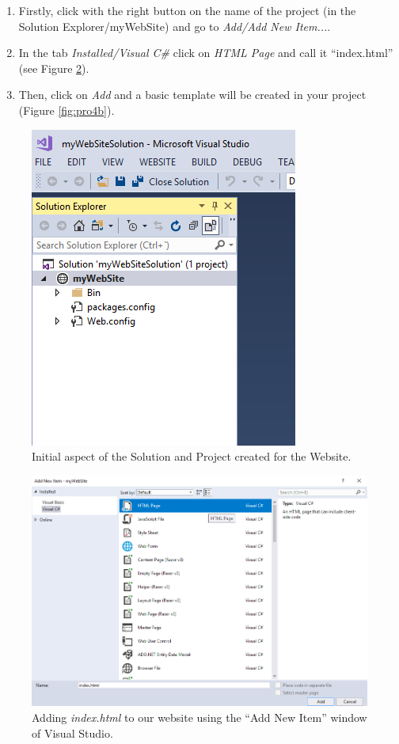 \begin{enumerate}
    \item Firstly, click with the right button on the name of the project (in the Solution Explorer/myWebSite) and go to \textit{Add/Add New Item...}.
    \item In the tab \textit{Installed/Visual C\#} click on \textit{HTML Page} and call it ``index.html'' (see Figure \ref{fig:pro4a}).
    \item Then, click on \textit{Add} and a basic template will be created in your project (Figure \ref{fig:pro4b}).
\end{enumerate}

\begin{figure}
    \centering
    \includegraphics[width= 0.5 \textwidth]{Figures/Projects/pro3}
    \caption{Initial aspect of the Solution and Project created for the Website.}
    \label{fig:pro3}
\end{figure}

\begin{figure}
    \centering
    \includegraphics[width= \textwidth]{Figures/Projects/pro4a}
    \caption{Adding \textit{index.html} to our website using the ``Add New Item'' window of Visual Studio.}
    \label{fig:pro4a}
\end{figure}

